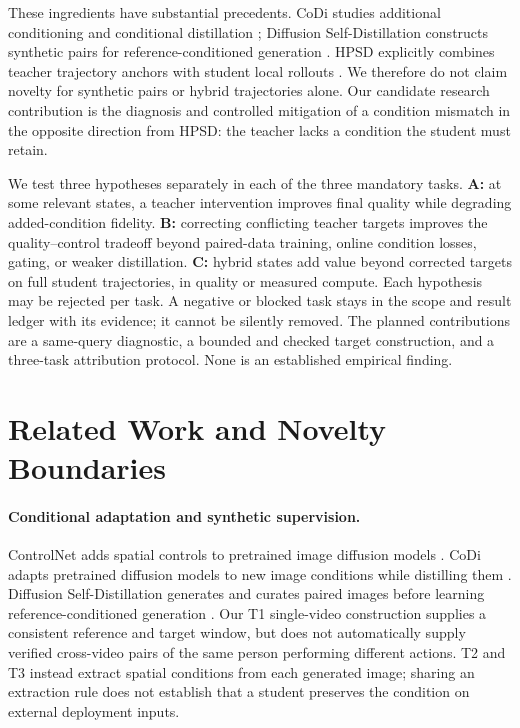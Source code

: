\documentclass[11pt]{article}
\begin{document}
These ingredients have substantial precedents. CoDi studies additional conditioning and conditional distillation \cite{codi}; Diffusion Self-Distillation constructs synthetic pairs for reference-conditioned generation \cite{dsd}. HPSD explicitly combines teacher trajectory anchors with student local rollouts \cite{hpsd}. We therefore do not claim novelty for synthetic pairs or hybrid trajectories alone. Our candidate research contribution is the diagnosis and controlled mitigation of a condition mismatch in the opposite direction from HPSD: the teacher lacks a condition the student must retain.

We test three hypotheses separately in each of the three mandatory tasks. \textbf{A:} at some relevant states, a teacher intervention improves final quality while degrading added-condition fidelity. \textbf{B:} correcting conflicting teacher targets improves the quality--control tradeoff beyond paired-data training, online condition losses, gating, or weaker distillation. \textbf{C:} hybrid states add value beyond corrected targets on full student trajectories, in quality or measured compute. Each hypothesis may be rejected per task. A negative or blocked task stays in the scope and result ledger with its evidence; it cannot be silently removed. The planned contributions are a same-query diagnostic, a bounded and checked target construction, and a three-task attribution protocol. None is an established empirical finding.

\section{Related Work and Novelty Boundaries}
\paragraph{Conditional adaptation and synthetic supervision.}
ControlNet adds spatial controls to pretrained image diffusion models \cite{controlnet}. CoDi adapts pretrained diffusion models to new image conditions while distilling them \cite{codi}. Diffusion Self-Distillation generates and curates paired images before learning reference-conditioned generation \cite{dsd}. Our T1 single-video construction supplies a consistent reference and target window, but does not automatically supply verified cross-video pairs of the same person performing different actions. T2 and T3 instead extract spatial conditions from each generated image; sharing an extraction rule does not establish that a student preserves the condition on external deployment inputs.
\end{document}

